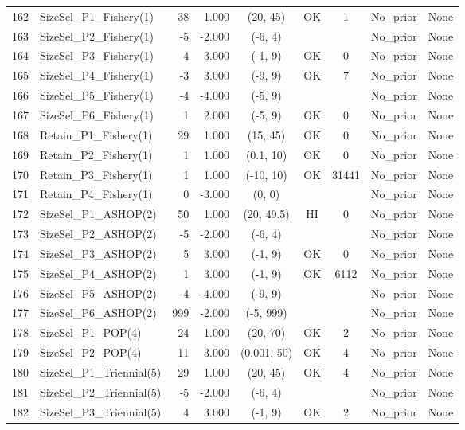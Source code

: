\documentclass[12pt,]{article}
\begin{document}
\begin{landscape}
\begin{longtable}{rlrrcccll}
  162 & SizeSel\_P1\_Fishery(1) & 38 & 1.000 & (20, 45) & OK & 1 & No\_prior & None \\ 
  163 & SizeSel\_P2\_Fishery(1) & -5 & -2.000 & (-6, 4) &  &  & No\_prior & None \\ 
  164 & SizeSel\_P3\_Fishery(1) & 4 & 3.000 & (-1, 9) & OK & 0 & No\_prior & None \\ 
  165 & SizeSel\_P4\_Fishery(1) & -3 & 3.000 & (-9, 9) & OK & 7 & No\_prior & None \\ 
  166 & SizeSel\_P5\_Fishery(1) & -4 & -4.000 & (-5, 9) &  &  & No\_prior & None \\ 
  167 & SizeSel\_P6\_Fishery(1) & 1 & 2.000 & (-5, 9) & OK & 0 & No\_prior & None \\ 
  168 & Retain\_P1\_Fishery(1) & 29 & 1.000 & (15, 45) & OK & 0 & No\_prior & None \\ 
  169 & Retain\_P2\_Fishery(1) & 1 & 1.000 & (0.1, 10) & OK & 0 & No\_prior & None \\ 
  170 & Retain\_P3\_Fishery(1) & 1 & 1.000 & (-10, 10) & OK & 31441 & No\_prior & None \\ 
  171 & Retain\_P4\_Fishery(1) & 0 & -3.000 & (0, 0) &  &  & No\_prior & None \\ 
  172 & SizeSel\_P1\_ASHOP(2) & 50 & 1.000 & (20, 49.5) & HI & 0 & No\_prior & None \\ 
  173 & SizeSel\_P2\_ASHOP(2) & -5 & -2.000 & (-6, 4) &  &  & No\_prior & None \\ 
  174 & SizeSel\_P3\_ASHOP(2) & 5 & 3.000 & (-1, 9) & OK & 0 & No\_prior & None \\ 
  175 & SizeSel\_P4\_ASHOP(2) & 1 & 3.000 & (-1, 9) & OK & 6112 & No\_prior & None \\ 
  176 & SizeSel\_P5\_ASHOP(2) & -4 & -4.000 & (-9, 9) &  &  & No\_prior & None \\ 
  177 & SizeSel\_P6\_ASHOP(2) & 999 & -2.000 & (-5, 999) &  &  & No\_prior & None \\ 
  178 & SizeSel\_P1\_POP(4) & 24 & 1.000 & (20, 70) & OK & 2 & No\_prior & None \\ 
  179 & SizeSel\_P2\_POP(4) & 11 & 3.000 & (0.001, 50) & OK & 4 & No\_prior & None \\ 
  180 & SizeSel\_P1\_Triennial(5) & 29 & 1.000 & (20, 45) & OK & 4 & No\_prior & None \\ 
  181 & SizeSel\_P2\_Triennial(5) & -5 & -2.000 & (-6, 4) &  &  & No\_prior & None \\ 
  182 & SizeSel\_P3\_Triennial(5) & 4 & 3.000 & (-1, 9) & OK & 2 & No\_prior & None \\ 

\end{longtable}
\end{landscape}
\end{document}
